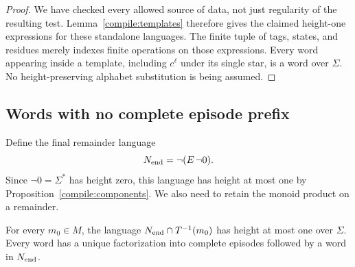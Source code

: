 \begin{proof}
We have checked every allowed source of data, not just regularity of the
resulting test. Lemma~\ref{compile:templates} therefore gives the claimed
height-one expressions for these standalone languages. The finite tuple
of tags, states, and residues merely indexes finite operations on those
expressions. Every word appearing inside a template, including $c^\ell$
under its single star, is a word over $\Sigma$. No height-preserving
alphabet substitution is being assumed.
\end{proof}

\subsection{Words with no complete episode prefix}

Define the final remainder language
\[
              N_{\rm end}=\neg(E\,\neg0).
\]
Since $\neg0=\Sigma^*$ has height zero, this language has height at most
one by Proposition~\ref{compile:components}. We also need to retain the
monoid product on a remainder.

\begin{lemma}\label{compile:remainder}
For every $m_0\in M$, the language
$N_{\rm end}\cap T^{-1}(m_0)$ has height at most one over $\Sigma$.
Every word has a unique factorization into complete episodes followed by
a word in $N_{\rm end}$.
\end{lemma}

